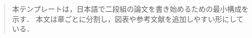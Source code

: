 \begin{abstract}
本テンプレートは，日本語で二段組の論文を書き始めるための最小構成を示す．
本文は章ごとに分割し，図表や参考文献を追加しやすい形にしている．
\end{abstract}
